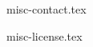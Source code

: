 \documentclass{cursuspresentatie}
\def\importslide#1#2{%
	{#2}
}
\begin{document}

















\importslide{misc}{misc-contact.tex}


\ifishandout
	\importslide{misc}{misc-license.tex}
\fi
	
\end{document}
